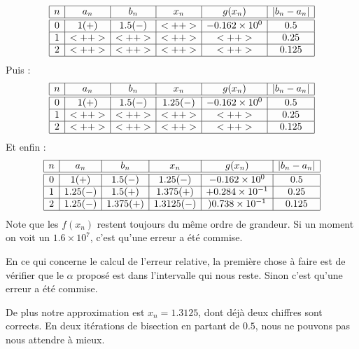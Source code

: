 \begin{example}
	\begin{equation*}
		\begin{array}[]{|c|c|c|c|c|c|}
			\hline
			n & a_n   & b_n     & x_n  & g(x_n)              & | b_n-a_n | \\
			\hline\hline
			0 & 1 (+) & 1.5 (-) & <++> & -0.162\times 10^{0} & 0.5         \\
			\hline
			1 & <++>  & <++>    & <++> & <++>                & 0.25        \\
			\hline
			2 & <++>  & <++>    & <++> & <++>                & 0.125       \\
			\hline
		\end{array}
	\end{equation*}
	Puis :
	\begin{equation*}
		\begin{array}[]{|c|c|c|c|c|c|}
			\hline
			n & a_n   & b_n     & x_n      & g(x_n)              & | b_n-a_n | \\
			\hline\hline
			0 & 1 (+) & 1.5 (-) & 1.25 (-) & -0.162\times 10^{0} & 0.5         \\
			\hline
			1 & <++>  & <++>    & <++>     & <++>                & 0.25        \\
			\hline
			2 & <++>  & <++>    & <++>     & <++>                & 0.125       \\
			\hline
		\end{array}
	\end{equation*}
	Et enfin :
	\begin{equation*}
		\begin{array}[]{|c|c|c|c|c|c|}
			\hline
			n & a_n      & b_n      & x_n       & g(x_n)               & | b_n-a_n | \\
			\hline\hline
			0 & 1 (+)    & 1.5 (-)  & 1.25 (-)  & -0.162\times 10^{0}  & 0.5         \\
			\hline
			1 & 1.25 (-) & 1.5(+)   & 1.375(+)  & +0.284\times 10^{-1} & 0.25        \\
			\hline
			2 & 1.25(-)  & 1.375(+) & 1.3125(-) & )0.738\times 10^{-1} & 0.125       \\
			\hline
		\end{array}
	\end{equation*}
	Note que les \( f(x_n)\) restent toujours du même ordre de grandeur. Si un moment on voit un \( 1.6\times 10^{7}\), c'est qu'une erreur a été commise.

	En ce qui concerne le calcul de l'erreur relative, la première chose à faire est de vérifier que le \( \alpha\) proposé est dans l'intervalle qui nous reste. Sinon c'est qu'une erreur a été commise.

	De plus notre approximation est \( x_n=1.3125\), dont déjà deux chiffres sont corrects. En deux itérations de bisection en partant de \( 0.5\), nous ne pouvons pas nous attendre à mieux.

\end{example}


